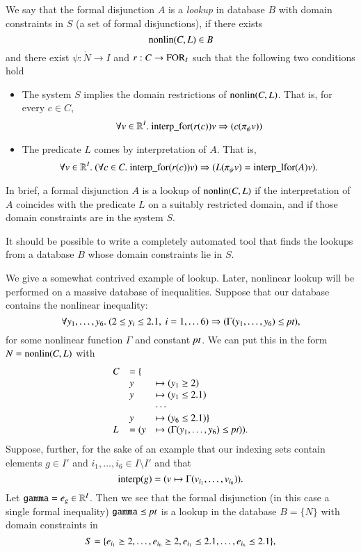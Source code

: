 \begin{definition}[lookup]
    We say that the formal disjunction $A$ is a {\it lookup} in
    database $B$ with domain constraints in $S$ (a set of formal disjunctions),
    if there exists
        $$
        {\operatorname{nonlin}}(C,L)\in B
        $$
    and there exist $\psi:\ring{N}\to I$ and
    $r:C\to{\operatorname{FOR}}_I$
    such that the following two conditions hold
    \begin{itemize}
    \item The system $S$ implies the domain restrictions of
    ${\operatorname{nonlin}}(C,L)$.  That is, for every $c \in C$,
        $$
        \forall v\in\mathbb{R}^I.\ {\operatorname{interp\_for}} (r(c)) v
        \Rightarrow (c(\pi_\psi v))
        $$
    \item The predicate $L$ comes by interpretation of $A$.  That
    is,
        $$
        \forall v\in \mathbb{R}^I.\ (\forall c\in C.\ {\operatorname{interp\_for}}(r(c)) v)
        \Rightarrow (L(\pi_\psi v) =
        {\operatorname{interp\_lfor}}(A) v).
        $$
    \end{itemize}
\end{definition}


In brief, a formal disjunction $A$ is a lookup of
${\operatorname{nonlin}}(C,L)$ if the interpretation of $A$ coincides with the
predicate $L$ on a suitably restricted domain, and if those domain
constraints are in the system $S$.

It should be possible to write a completely automated tool that
finds the lookups from a database $B$ whose domain constraints lie
in $S$.

\begin{example}  We give a somewhat contrived example of lookup.
Later, nonlinear lookup will be performed on a massive database of
inequalities.  Suppose that our database contains the nonlinear
inequality:
    $$\forall y_1,\ldots,y_6.\ (2\le y_i \le 2.1,\ i=1,\ldots
    6) \Rightarrow (\Gamma(y_1,\ldots,y_6) \le \hbox{\it pt}),
    $$
    for some nonlinear function $\Gamma$ and constant $\hbox{\it pt}$.
We can put this in the form $N = {\operatorname{nonlin}}(C,L)$ with
    $$
    \begin{array}{llll}
    C &= \{\\
        &y&\mapsto (y_1\ge 2)\\
        &y&\mapsto (y_1\le 2.1)\\
        &&\cdots\\
        &y&\mapsto (y_6\le 2.1)\}\\
    L &= (y&\mapsto (\Gamma(y_1,\ldots,y_6)\le \hbox{\it pt})).
    \end{array}
    $$
Suppose, further, for the sake of an example that our indexing
sets contain elements $g\in I'$ and $i_1,\ldots,i_6\in I\setminus
I'$ and that
    $$
    {\operatorname{interp}}(g) = (v \mapsto \Gamma(v_{i_1},\ldots,v_{i_6})).
    $$
Let ${\operatorname{{\texttt{gamma}}}} = e_g \in\mathbb{R}^{I}$. Then we see that the
formal disjunction (in this case a single formal inequality)
${\operatorname{{\texttt{gamma}}}} \preceq \hbox{\it pt}$ is a lookup in the database $B = \{N\}$
with domain constraints in
    $$
    S = \{e_{i_1}\succeq 2,\ldots,e_{i_6}\succeq 2,
          e_{i_1}\preceq 2.1,\ldots, e_{i_6}\preceq 2.1\},
    $$
\end{example}


